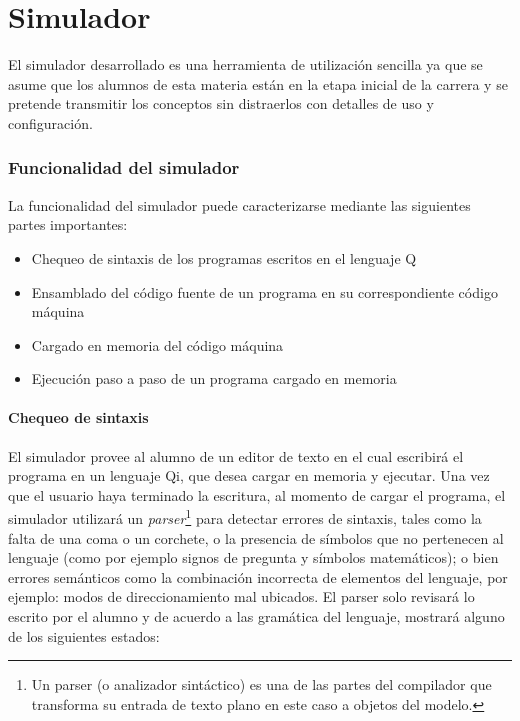 \part{Simulador \qsim}


El simulador desarrollado es una herramienta de utilización sencilla ya que se asume que los alumnos de esta materia están en la etapa inicial de la carrera y se pretende transmitir los conceptos sin distraerlos con detalles de uso y configuración.

\section{Funcionalidad del simulador}

La funcionalidad del simulador puede caracterizarse mediante las siguientes partes importantes:

\begin{itemize}
\item Chequeo de sintaxis de los programas escritos en el lenguaje Q
\item Ensamblado del código fuente de un programa en su correspondiente código máquina
\item Cargado en memoria del código máquina
\item Ejecución paso a paso de un programa cargado en memoria
\end{itemize}

\subsection{Chequeo de sintaxis}\label{parser}

El simulador provee al alumno de un editor de texto en el cual escribirá el programa en un lenguaje Qi, que desea cargar en memoria y ejecutar.
Una vez que el usuario haya terminado la escritura, al momento de cargar el programa, el simulador utilizará un \textit{parser}\footnote{Un parser (o analizador sintáctico) es una de las partes del compilador que transforma su entrada de texto plano en este caso a objetos del modelo.} para detectar errores de sintaxis, tales como la falta de una coma o un corchete, o la presencia de símbolos que no pertenecen al lenguaje (como por ejemplo signos de pregunta y símbolos matemáticos); o bien errores semánticos como la combinación incorrecta de elementos del lenguaje, por ejemplo: modos de direccionamiento mal ubicados.
El parser solo revisará lo escrito por el alumno y de acuerdo a las gramática del lenguaje, mostrará alguno de los siguientes estados:

